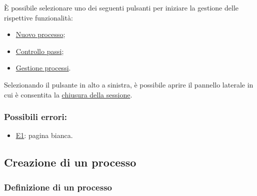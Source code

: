 È possibile selezionare uno dei seguenti pulsanti per iniziare la gestione delle rispettive funzionalità:
\begin{itemize}
\item  \hyperref[creazione]{Nuovo processo};
\item  \hyperref[controllo]{Controllo passi};
\item  \hyperref[gestione]{Gestione processi}.
\end{itemize}

Selezionando il pulsante in alto a sinistra, è possibile aprire il pannello laterale in cui è consentita la \hyperref[logout]{chiusura della sessione}.

\subsubsection*{Possibili errori:}
\begin{itemize}
\item \hyperref[e1]{E1}: pagina bianca.
\end{itemize}

\subsection{Creazione di un processo}
\label{creazione}

\subsubsection{Definizione di un processo}

